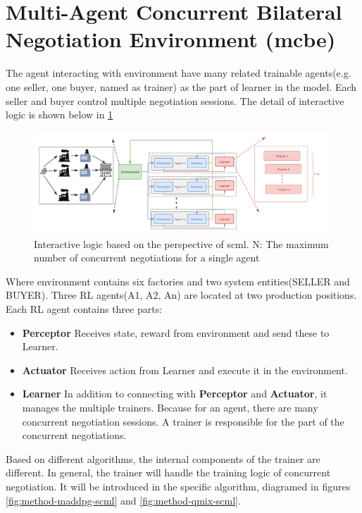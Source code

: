 \section{Multi-Agent Concurrent Bilateral Negotiation Environment (\gls{mcbe})} 
The agent interacting with environment have many related trainable agents(e.g. one seller, one buyer, named as trainer) as the part of learner in the model. Each seller and buyer control multiple negotiation sessions. The detail of interactive logic is shown below in \ref{fig:interacting-logic-scml}

\begin{figure}[htbp]
\centering
\includegraphics[width=1.0\textwidth]{./images/scnk.png}
\caption{Interactive logic based on the perspective of \gls{scml}. N: The maximum number of concurrent negotiations for a single agent}
\label{fig:interacting-logic-scml}
\end{figure}

Where environment contains six factories and two system entities(SELLER and BUYER). Three RL agents(A1, A2, An) are located at two production positions. Each RL agent contains three parts:

\begin{itemize}
\item \textbf{Perceptor} Receives state, reward from environment and send these to Learner.
\item \textbf{Actuator} Receives action from Learner and execute it in the environment.
\item \textbf{Learner} In addition to connecting with \textbf{Perceptor} and \textbf{Actuator}, it manages the multiple trainers. Because for an agent, there are many concurrent negotiation sessions. A trainer is responsible for the part of the concurrent negotiations.
\end{itemize}

Based on different algorithms, the internal components of the trainer are different. In general, the trainer will handle the training logic of concurrent negotiation. It will be introduced in the specific algorithm, diagramed in figures \ref{fig:method-maddpg-scml} and \ref{fig:method-qmix-scml}.

